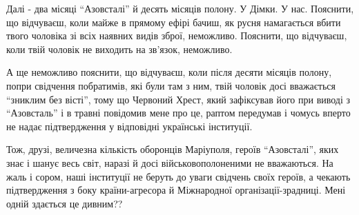 Далі - два місяці \enquote{Азовсталі} й десять місяців полону. У Дімки.
У нас. Пояснити, що відчуваєш, коли майже в прямому ефірі бачиш,
як русня намагається вбити твого чоловіка зі всіх наявних видів
зброї, неможливо. Пояснити, що відчуваєш, коли твій чоловік не
виходить на зв'язок, неможливо. 

А ще неможливо пояснити, що відчуваєш, коли після десяти
місяців полону, попри  свідчення побратимів, які були там з
ним, твій чоловік досі вважається \enquote{зниклим без вісті}, тому що
Червоний Хрест, який зафіксував його при виводі з \enquote{Азовсталь}
і в травні повідомив мене про це, раптом передумав і чомусь
вперто не надає підтвердження у відповідні українські
інституції. 

Тож, друзі, величезна кількість оборонців Маріуполя,
героїв \enquote{Азовсталі}, яких знає і шанує весь світ, наразі
й досі військовополоненими не вважаються. На жаль і
сором, наші інституції не беруть до уваги свідчень своїх
героїв, а чекають підтвердження з боку країни-агресора й
Міжнародної організації-зрадниці. Мені одній здається це
дивним??

